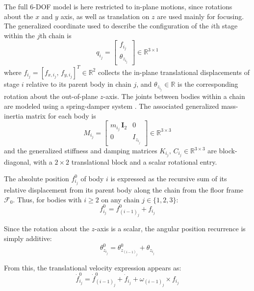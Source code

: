 The full 6-DOF model is here restricted to in-plane motions\cite{Al-Rawashdeh2023_Trajectories,Dong2023_SCurve}, since rotations about the $x$ and $y$ axis, as well as translation on $z$ are used mainly for focusing. The generalized coordinate used to describe the configuration of the $i$th stage within the $j$th chain is
\begin{equation}
    q_{i_j} = \begin{bmatrix} f_{i_j} \\ \theta_{z_{i_j}} \end{bmatrix} \in \mathbb{R}^{3\times1}
\end{equation}
where $f_{i_j} = [f_{x,i_j},\, f_{y,i_j}]^T \in \mathbb{R}^{2}$ collects the in-plane translational displacements of stage $i$ relative to its parent body in chain $j$, and $\theta_{z_{i_j}} \in \mathbb{R}$ is the corresponding rotation about the out-of-plane $z$-axis. The joints between bodies within a chain are modeled using a spring-damper system \cite{Al-Rawashdeh2022_Caracterization}. The associated generalized mass-inertia matrix for each body is
\begin{equation}
    M_{i_j} = \begin{bmatrix} m_{i_j}\,\mathbf{I}_2 & 0 \\ 0 & I_{z_{i_j}} \end{bmatrix} \in \mathbb{R}^{3\times3}
\end{equation}
and the generalized stiffness and damping matrices $K_{i_j},\, C_{i_j} \in \mathbb{R}^{3\times3}$ are block-diagonal, with a $2\times2$ translational block and a scalar rotational entry.

The absolute position $f^{0}_{i_j}$ of body $i$ is expressed as the recursive sum of its relative displacement from its parent body along the chain from the floor frame $\mathcal{F}_{0}$. Thus, for bodies with $i \geq 2$ on any chain $j \in \{1,2,3\}$:
\begin{equation} \label{eq:frameref}
    f^{0}_{i_j} = f^{0}_{(i-1)_j} + f_{i_j}
\end{equation}

Since the rotation about the $z$-axis is a scalar, the angular position recurrence is simply additive:
\begin{equation} \label{eq:angleref}
    \theta^{0}_{z_{i_j}} = \theta^{0}_{z_{(i-1)_j}} + \theta_{z_{i_j}}
\end{equation}

From this, the translational velocity expression appears as:
\begin{equation}
    \dot{f}^{0}_{i_j} = \dot{f}^{0}_{(i-1)_j} + \dot{f}_{i_j} + \omega_{(i-1)_j}
    \times
    f_{i_j}
\end{equation}

